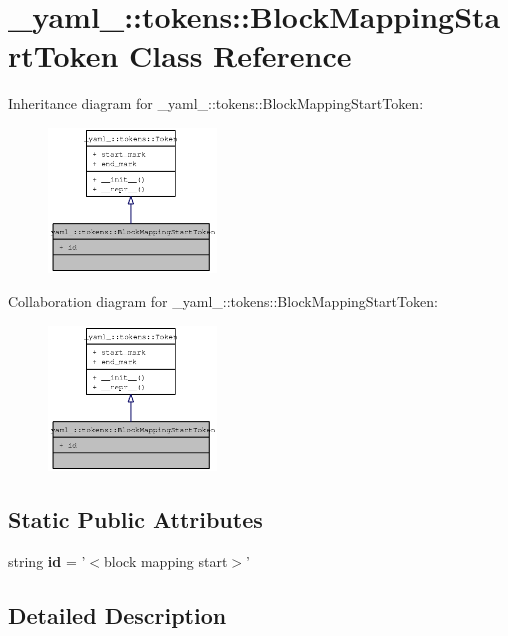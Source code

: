 \section{\_\-yaml\_\-::tokens::BlockMappingStartToken Class Reference}
\label{class__yaml___1_1tokens_1_1BlockMappingStartToken}
Inheritance diagram for \_\-yaml\_\-::tokens::BlockMappingStartToken:\nopagebreak
\begin{figure}[H]
\begin{center}
\leavevmode
\includegraphics[width=127pt]{class__yaml___1_1tokens_1_1BlockMappingStartToken__inherit__graph}
\end{center}
\end{figure}
Collaboration diagram for \_\-yaml\_\-::tokens::BlockMappingStartToken:\nopagebreak
\begin{figure}[H]
\begin{center}
\leavevmode
\includegraphics[width=127pt]{class__yaml___1_1tokens_1_1BlockMappingStartToken__coll__graph}
\end{center}
\end{figure}
\subsection*{Static Public Attributes}
\begin{CompactItemize}
\item 
string {\bf id} = '$<$block mapping start$>$'
\end{CompactItemize}


\subsection{Detailed Description}


